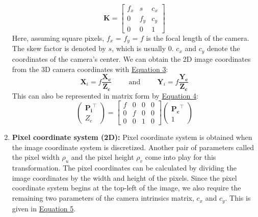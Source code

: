 \begin{enumerate}
\begin{equation}
    \mathbf{K}
    =
    \begin{bmatrix}
        f_x & s & c_x \\
        0 & f_y & c_y \\
        0 & 0 & 1
    \end{bmatrix}
\end{equation}\label{eq:cam-intrinsic}
Here, assuming square pixels, $f_x$ = $f_y$ = $f$ is the focal length of the camera. The skew factor is denoted by $s$, which is usually $0$. $c_x$ and $c_y$ denote the coordinates of the camera's center.
We can obtain the 2D image coordinates from the 3D camera coordinates with \hyperref[eq:image-from-cam]{Equation 3}:
\begin{equation}
    \mathbf{X}_i = f\frac{\mathbf{X_c}}{\mathbf{Z_c}}\hspace{1cm} \text{and} \hspace{1cm}\mathbf{Y}_i = f\frac{\mathbf{Y_c}}{\mathbf{Z_c}}
\end{equation}\label{eq:image-from-cam}
This can also be represented in matrix form by \hyperref[eq:image-from-cam-matrix]{Equation 4}:
\begin{equation}
    \begin{pmatrix}
            \mathbf{P_i}^\intercal \\
            Z_c
        \end{pmatrix}
        = 
        \begin{bmatrix}
            f & 0 & 0 &0\\
            0 & f & 0 &0\\
            0 & 0 & 1 &0
        \end{bmatrix}
        \begin{pmatrix}
            \mathbf{P_c}^\intercal \\
            1
        \end{pmatrix}
\end{equation}\label{eq:image-from-cam-matrix}
\item \textbf{Pixel coordinate system (2D):} Pixel coordinate system is obtained when the image coordinate system is discretized. Another pair of parameters called the pixel width $\rho_u$ and the pixel height $\rho_v$ come into play for this transformation. The pixel coordinates can be calculated by dividing the image coordinates by the width and height of the pixels. Since the pixel coordinate system begins at the top-left of the image, we also require the remaining two parameters of the camera intrinsics matrix, $c_x$ and $c_y$. This is given in \hyperref[eq:pix-from-img]{Equation 5}.

\end{enumerate}
